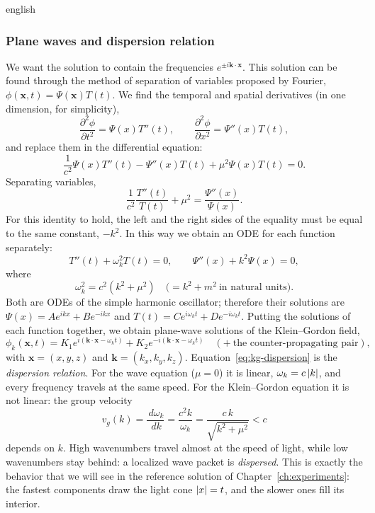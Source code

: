 \begin{hyphenrules}{english}
\subsubsection{Plane waves and dispersion relation}
We want the solution to contain the frequencies $e^{\pm i\mathbf{k}\cdot\mathbf{x}}$. This solution can be found
through the method of separation of variables proposed by Fourier, $\phi(\mathbf{x},t)=\Psi(\mathbf{x})T(t)$. We find
the temporal and spatial derivatives (in one dimension, for simplicity),
\begin{equation}
  \frac{\partial^2\phi}{\partial t^2}=\Psi(x)T''(t),\qquad
  \frac{\partial^2\phi}{\partial x^2}=\Psi''(x)T(t),
  \label{eq:kg-sep-1}
\end{equation}
and replace them in the differential equation:
\begin{equation}
  \frac{1}{c^2}\Psi(x)T''(t)-\Psi''(x)T(t)+\mu^2\Psi(x)T(t)=0.
  \label{eq:kg-sep-2}
\end{equation}
Separating variables,
\[
  \frac{1}{c^2}\frac{T''(t)}{T(t)}+\mu^2=\frac{\Psi''(x)}{\Psi(x)}.
\]
For this identity to hold, the left and the right sides of the equality must be equal to the same
constant, $-k^2$. In this way we obtain an ODE for each function separately:
\begin{equation}
  T''(t)+\omega_k^2T(t)=0,\qquad \Psi''(x)+k^2\Psi(x)=0,
  \label{eq:kg-odes}
\end{equation}
where
\begin{equation}
  \omega_k^2=c^2(k^2+\mu^2)\quad\big(=k^2+m^2\ \text{in natural units}\big).
  \label{eq:kg-dispersion}
\end{equation}
Both are ODEs of the simple harmonic oscillator; therefore their solutions are
$\Psi(x)=Ae^{ikx}+Be^{-ikx}$ and $T(t)=Ce^{i\omega_kt}+De^{-i\omega_kt}$. Putting the solutions of each
function together, we obtain plane-wave solutions of the Klein--Gordon field,
\begin{equation}
  \phi_k(\mathbf{x},t)=K_1e^{i(\mathbf{k}\cdot\mathbf{x}-\omega_kt)}+K_2e^{-i(\mathbf{k}\cdot\mathbf{x}-\omega_kt)}
  \quad(+\ \text{the counter-propagating pair}),
  \label{eq:kg-planewave}
\end{equation}
with $\mathbf{x}=(x,y,z)$ and $\mathbf{k}=(k_x,k_y,k_z)$. Equation~\eqref{eq:kg-dispersion} is the \emph{dispersion
relation}. For the wave equation ($\mu=0$) it is linear, $\omega_k=c\left\lvert k \right\rvert$, and every frequency
travels at the same speed. For the Klein--Gordon equation it is not linear: the group velocity
\begin{equation}
  v_g(k)=\frac{\,d\omega_k}{\,d k}=\frac{c^2k}{\omega_k}=\frac{c\,k}{\sqrt{k^2+\mu^2}}<c
  \label{eq:kg-group-velocity}
\end{equation}
depends on $k$. High wavenumbers travel almost at the speed of light, while low wavenumbers stay behind:
a localized wave packet is \emph{dispersed}. This is exactly the behavior that we will see in the
reference solution of Chapter~\ref{ch:experiments}: the fastest components draw the light cone $\left\lvert x \right\rvert=t$,
and the slower ones fill its interior.


\end{hyphenrules}
